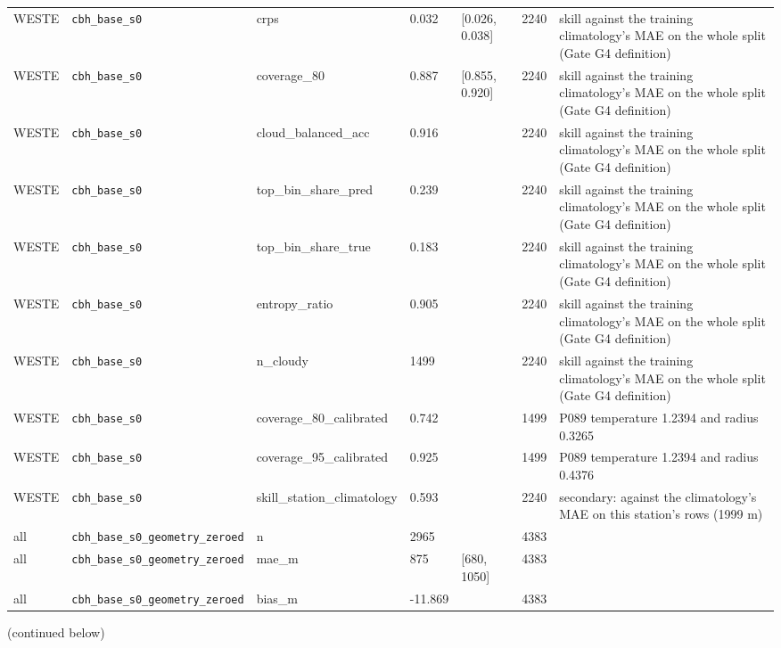 \begin{center}
{\begin{tabular}{lp{2.4cm}llllp{7.3cm}}
WESTE & \texttt{cbh\_\allowbreak{}base\_\allowbreak{}s0} & crps & 0.032 & [0.026, 0.038] & 2240 & skill against the training climatology's MAE on the whole split (Gate G4 definition) \\
WESTE & \texttt{cbh\_\allowbreak{}base\_\allowbreak{}s0} & coverage\_80 & 0.887 & [0.855, 0.920] & 2240 & skill against the training climatology's MAE on the whole split (Gate G4 definition) \\
WESTE & \texttt{cbh\_\allowbreak{}base\_\allowbreak{}s0} & cloud\_balanced\_acc & 0.916 &  & 2240 & skill against the training climatology's MAE on the whole split (Gate G4 definition) \\
WESTE & \texttt{cbh\_\allowbreak{}base\_\allowbreak{}s0} & top\_bin\_share\_pred & 0.239 &  & 2240 & skill against the training climatology's MAE on the whole split (Gate G4 definition) \\
WESTE & \texttt{cbh\_\allowbreak{}base\_\allowbreak{}s0} & top\_bin\_share\_true & 0.183 &  & 2240 & skill against the training climatology's MAE on the whole split (Gate G4 definition) \\
WESTE & \texttt{cbh\_\allowbreak{}base\_\allowbreak{}s0} & entropy\_ratio & 0.905 &  & 2240 & skill against the training climatology's MAE on the whole split (Gate G4 definition) \\
WESTE & \texttt{cbh\_\allowbreak{}base\_\allowbreak{}s0} & n\_cloudy & 1499 &  & 2240 & skill against the training climatology's MAE on the whole split (Gate G4 definition) \\
WESTE & \texttt{cbh\_\allowbreak{}base\_\allowbreak{}s0} & coverage\_80\_calibrated & 0.742 &  & 1499 & P089 temperature 1.2394 and radius 0.3265 \\
WESTE & \texttt{cbh\_\allowbreak{}base\_\allowbreak{}s0} & coverage\_95\_calibrated & 0.925 &  & 1499 & P089 temperature 1.2394 and radius 0.4376 \\
WESTE & \texttt{cbh\_\allowbreak{}base\_\allowbreak{}s0} & skill\_station\_climatology & 0.593 &  & 2240 & secondary: against the climatology's MAE on this station's rows (1999 m) \\
all & \texttt{cbh\_\allowbreak{}base\_\allowbreak{}s0\_\allowbreak{}geometry\_\allowbreak{}zeroed} & n & 2965 &  & 4383 &  \\
all & \texttt{cbh\_\allowbreak{}base\_\allowbreak{}s0\_\allowbreak{}geometry\_\allowbreak{}zeroed} & mae\_m & 875 & [680, 1050] & 4383 &  \\
all & \texttt{cbh\_\allowbreak{}base\_\allowbreak{}s0\_\allowbreak{}geometry\_\allowbreak{}zeroed} & bias\_m & -11.869 &  & 4383 &  \\
\bottomrule
\end{tabular}}\par\footnotesize(continued below)
\end{center}

